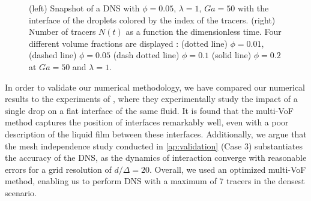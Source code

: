 \begin{figure}[h!]
    \centering
    \caption{
    (left) Snapshot of a DNS with $\phi = 0.05$, $\lambda = 1$, $Ga = 50$ with the interface of the droplets colored by the index of the tracers.
    (right) Number of tracers $N(t)$ as a function the dimensionless time.
    Four different volume fractions are displayed : (dotted line) $\phi = 0.01$, (dashed line) $\phi = 0.05$ (dash dotted line) $\phi = 0.1$ (solid line) $\phi = 0.2$ at $Ga = 50$ and $\lambda = 1$. 
    }
    \label{fig:diagram}
\end{figure}


In order to validate our numerical methodology, we have compared our numerical results to the experiments of \citet{mohamed2003drop}, where they experimentally study the impact of a single drop on a flat interface of the same fluid. %
It is found that the multi-VoF method captures the position of interfaces remarkably well, even with a poor description of the liquid film between these interfaces.
Additionally, we argue that the mesh independence study conducted in \ref{ap:validation} (Case 3) substantiates the accuracy of the DNS, as the dynamics of interaction converge with reasonable errors for a grid resolution of $d/\Delta = 20$. 
Overall, we used an optimized multi-VoF method, enabling us to perform DNS with a maximum of 7 tracers in the densest scenario. 





